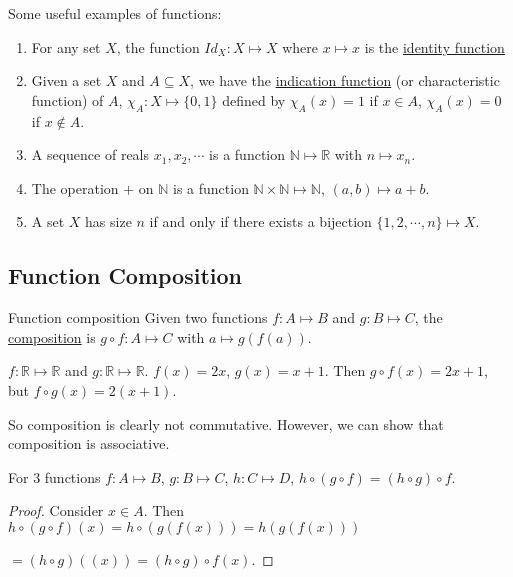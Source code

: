 \documentclass[../Main.tex]{subfiles}
\begin{document}
Some useful examples of functions:
\begin{enumerate}
    \item For any set $X$, the function $Id_X : X \mapsto X$ where $x \mapsto x$ is the \underline{identity function}
    \item Given a set $X$ and $A \subseteq X$, we have the \underline{indication function} (or characteristic function) of $A$, $\chi_A : X \mapsto \{0, 1\}$ defined by $\chi_A(x) = 1$ if $x \in A$, $\chi_A(x) = 0$ if $x \notin A$.
    \item A sequence of reals $x_1, x_2, \cdots$  is a function $\mathbb{N} \mapsto \mathbb{R}$ with $n \mapsto x_n$.
    \item The operation $+$ on $\mathbb{N}$ is a function $\mathbb{N} \times \mathbb{N} \mapsto \mathbb{N}$, $(a, b) \mapsto a + b$.
    \item A set $X$ has size $n$ if and only if there exists a bijection $\{1, 2, \cdots, n\} \mapsto X$.
\end{enumerate}
\subsection{Function Composition}
\begin{definition}{Function composition}
Given two functions $f : A \mapsto B$ and $g : B \mapsto C$, the \underline{composition} is $g \circ f : A \mapsto C$ with $a \mapsto g(f(a))$.
\end{definition}
\begin{example}
    $f : \mathbb{R} \mapsto \mathbb{R}$ and $g : \mathbb{R} \mapsto \mathbb{R}$.
    $f(x) = 2x$, $g(x) = x + 1$.
    Then $g \circ f(x) = 2x + 1$, but $f \circ g(x) = 2(x+1)$.
\end{example}
So composition is clearly not commutative. However, we can show that composition is associative.
\begin{proposition}
    For 3 functions $f : A \mapsto B$, $g : B \mapsto C$, $h : C \mapsto D$, $h \circ (g \circ f) = (h \circ g) \circ f$.
\end{proposition}
\begin{proof}
    Consider $x \in A$. Then $h \circ (g \circ f)(x) = h \circ (g(f(x))) = h(g(f(x)))$\par
    $=(h \circ g)((x)) = (h \circ g) \circ f(x)$.
\end{proof}
\end{document}
